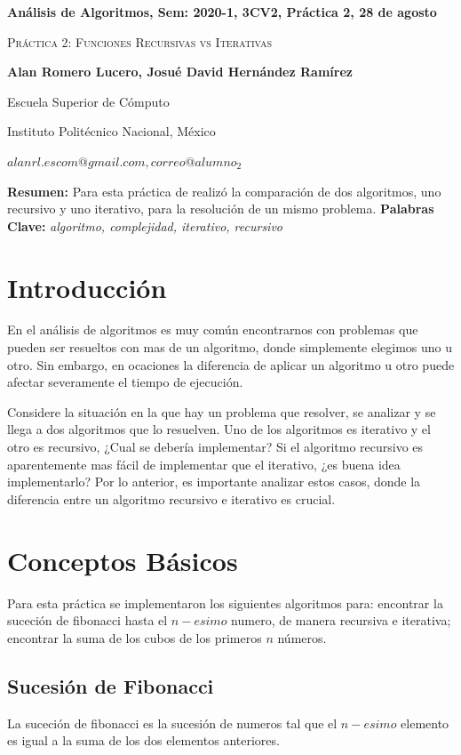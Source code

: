 \documentclass[12pt,twoside]{article}
\date{}
\begin{document}
\centerline{\bf An\'alisis de Algoritmos, Sem: 2020-1, 3CV2, Pr\'actica 2, 28 de agosto}
\centerline{}
\centerline{}
\begin{center}
\Large{\textsc{Pr\'actica 2: Funciones Recursivas vs Iterativas}}
\end{center}
\centerline{}
\centerline{\bf {Alan Romero Lucero, Josué David Hern\'andez Ram\'irez}}
\centerline{}
\centerline{Escuela Superior de C\'omputo}
\centerline{Instituto Polit\'ecnico Nacional, M\'exico}
\centerline{$alanrl.escom@gmail.com, correo@alumno_2$}
\newtheorem{Theorem}{\quad Theorem}[section]
\newtheorem{Definition}[Theorem]{\quad Definition}
\newtheorem{Corollary}[Theorem]{\quad Corollary}
\newtheorem{Lemma}[Theorem]{\quad Lemma}
\newtheorem{Example}[Theorem]{\quad Example}
\bigskip
\textbf{Resumen:} Para esta pr\'actica de realiz\'o la comparaci\'on de dos algoritmos, uno recursivo y uno iterativo, para la resoluci\'on de un mismo problema.
{\bf Palabras Clave:} {\textit{algoritmo, complejidad, iterativo, recursivo}}
\section{Introducci\'on}
En el an\'alisis de algoritmos es muy com\'un encontrarnos con problemas que pueden ser resueltos con mas de un algoritmo, donde simplemente elegimos uno u otro. Sin embargo, en ocaciones la diferencia de aplicar un algoritmo u otro puede afectar severamente el tiempo de ejecuci\'on.

Considere la situaci\'on en la que hay un problema que resolver, se analizar y se llega a dos algoritmos que lo resuelven. Uno de los algoritmos es iterativo y el otro es recursivo, ¿Cual se deber\'ia implementar? Si el algoritmo recursivo es aparentemente mas f\'acil de implementar que el iterativo, ¿es buena idea implementarlo? Por lo anterior, es importante analizar estos casos, donde la diferencia entre un algoritmo recursivo e iterativo es crucial.
\section{Conceptos B\'asicos}
Para esta pr\'actica se implementaron los siguientes algoritmos para: encontrar la suceci\'on de fibonacci hasta el $n-esimo$ numero, de manera recursiva e iterativa; encontrar la suma de los cubos de los primeros $n$ n\'umeros.
\subsection{Sucesi\'on de Fibonacci}
La suceci\'on de fibonacci es la sucesi\'on de numeros tal que el $n-esimo$ elemento es igual a la suma de los dos elementos anteriores.
\end{document}
